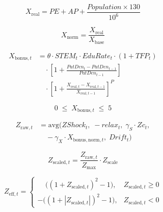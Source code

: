 \documentclass{article}
\begin{document}

\begin{equation}
X_{\mathrm{real}} = PE + AP + \frac{Population \times 130}{10^6}
\end{equation}

\begin{equation}
X_{\mathrm{norm}} = \frac{X_{\mathrm{real}}}{X_{\mathrm{base}}}
\end{equation}

\begin{equation}
\begin{aligned}
X_{\mathrm{bonus},t} &= \theta \cdot STEM_t \cdot EduRate_t \cdot (1 + TFP_t) \\
&\quad \cdot \left[ 1 + \frac{PatDen_t - PatDen_{t-1}}{PatDen_{t-1}} \right] \\
&\quad \cdot \left[ 1 + \frac{X_{\mathrm{real},t} - X_{\mathrm{real},t-1}}{X_{\mathrm{real},t-1}} \right]^{P}
\end{aligned}
\end{equation}

\begin{equation}
0 \; \leq \; X_{\mathrm{bonus},t} \; \leq \; 5
\end{equation}

\begin{equation}
\begin{aligned}
Z_{\mathrm{raw},t} &= \mathrm{avg}\Big( ZShock_t,\; -relax_t,\; 
\gamma_S \cdot Zc_t, \\
&\quad -\gamma_X \cdot X_{\mathrm{bonus,norm},t},\; Drift_t \Big)
\end{aligned}
\end{equation}

\begin{equation}
Z_{\mathrm{scaled},t} = \frac{Z_{\mathrm{raw},t}}{Z_{\max}} \cdot Z_{\mathrm{scale}}
\end{equation}

\begin{equation}
Z_{\mathrm{eff},t} =
\begin{cases}
\;\;\;\;\big( (1 + Z_{\mathrm{scaled},t})^2 - 1 \big), & Z_{\mathrm{scaled},t} \geq 0 \\
- \big( (1 + |Z_{\mathrm{scaled},t}|)^2 - 1 \big), & Z_{\mathrm{scaled},t} < 0
\end{cases}
\end{equation}
\end{document}
